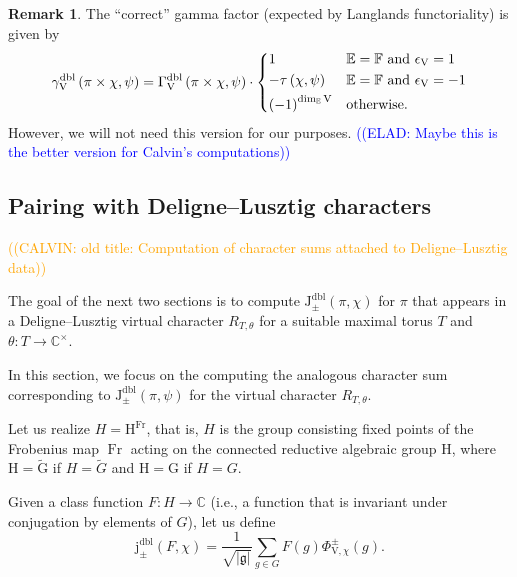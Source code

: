 \documentclass[12pt, reqno]{amsart}
\theoremstyle{definition}
\theoremstyle{definition}
\newtheorem{remark}[theorem]{Remark}
\theoremstyle{definition}
\newcommand{\cComplex}{\mathbb{C}}
\newcommand{\multiplicativegroup}[1]{#1^{\times}}
\newcommand{\sizeof}[1]{\left|#1\right|}
\newcommand{\hermitianSpace}{\mathrm{V}}
\newcommand{\fieldCharacter}{\psi}
\newcommand{\finiteField}{\mathbb{F}}
\newcommand{\quadraticExtension}{\mathbb{E}}
\newcommand{\Frobenius}{\operatorname{Fr}}
\newcommand{\GaussSumSingleCharacter}[2]{\tau\left(#1, #2\right)}
\newcommand{\genHermitianJacobiKernel}[2]{\Phi^{\pm}_{#1,#2}}
\newcommand{\dblJacobiSumScalar}[2]{\mathrm{J}_{\pm}^{\mathrm{dbl}}\left(#1, #2\right)}
\newcommand{\dblVirtualJacobiSumScalar}[2]{\mathrm{j}_{\pm}^{\mathrm{dbl}}\left(#1, #2\right)}
\newcommand{\dblGammaFactorSpace}[4]{\Gamma^{\mathrm{dbl}}_{#1}\left(#2 \times #3, #4\right)}
\newcommand{\dblLanglandsGammaFactorSpace}[4]{\gamma^{\mathrm{dbl}}_{#1}\left(#2 \times #3, #4\right)}
\newcommand{\lieAlgebra}{\mathfrak{g}}
\newcommand{\algebraicGroup}[1]{\boldsymbol{\mathrm{#1}}}
\newcommand{\calvin}[1]{\textcolor{orange}{\sffamily ((CALVIN: #1))}}
\newcommand{\elad}[1]{\textcolor{blue}{\sffamily ((ELAD: #1))}}
\begin{document}
\begin{remark}
	The ``correct'' gamma factor (expected by Langlands functoriality) is given by $$\dblLanglandsGammaFactorSpace{\hermitianSpace}{\pi}{\chi}{\fieldCharacter} = \dblGammaFactorSpace{\hermitianSpace}{\pi}{\chi}{\fieldCharacter} \cdot \begin{dcases}
				1 & \quadraticExtension = \finiteField \text{ and } \epsilon_{\hermitianSpace} = 1\\
				-\GaussSumSingleCharacter{\chi} {\fieldCharacter} & \quadraticExtension = \finiteField \text{ and } \epsilon_{\hermitianSpace} = -1 \\
				\left(-1\right)^{\dim_{\quadraticExtension} \hermitianSpace} & \text{otherwise.}
	\end{dcases}$$
	However, we will not need this version for our purposes. \elad{Maybe this is the better version for Calvin's computations}
\end{remark}

\subsection{Pairing with Deligne--Lusztig characters}
\calvin{old title: Computation of character sums attached to Deligne--Lusztig data}

The goal of the next two sections is to compute $\dblJacobiSumScalar{\pi}{\chi}$ for $\pi$ that appears in a Deligne--Lusztig virtual character $R_{T,\theta}$ for a suitable maximal torus $T$ and $\theta \colon T \to \multiplicativegroup{\cComplex}$.

In this section, we focus on the computing the analogous character sum corresponding to $\dblJacobiSumScalar{\pi}{\fieldCharacter}$ for the virtual character $R_{T,\theta}$.

Let us realize $H = \algebraicGroup{H}^{\Frobenius}$, that is, $H$ is the group consisting fixed points of the Frobenius map $\Frobenius$ acting on the connected reductive algebraic group $\algebraicGroup{H}$, where $\algebraicGroup{H} = \tilde{\algebraicGroup{G}}$ if $H = \tilde{G}$ and $\algebraicGroup{H} = \algebraicGroup{G}$ if $H = G$.

Given a class function $F \colon H \to \cComplex$ (i.e., a function that is invariant under conjugation by elements of $G$), let us define $$\dblVirtualJacobiSumScalar{F}{\chi} = \frac{1}{\sqrt{\sizeof{\lieAlgebra}}} \sum_{g \in G} F\left(g\right) \genHermitianJacobiKernel{\hermitianSpace}{\chi}\left(g\right).$$
\end{document}
